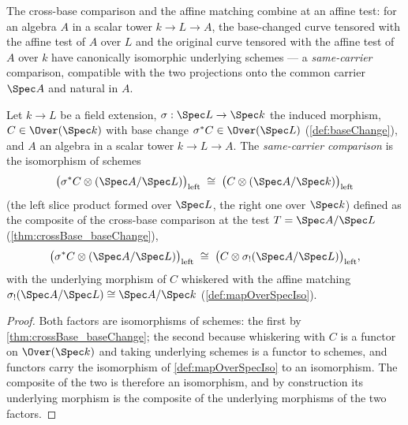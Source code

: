 The cross-base comparison and the affine matching combine at an affine test: for an
algebra \(A\) in a scalar tower \(k \to L \to A\), the base-changed curve tensored with
the affine test of \(A\) over \(L\) and the original curve tensored with the affine test
of \(A\) over \(k\) have canonically isomorphic underlying schemes --- a
\emph{same-carrier} comparison, compatible with the two projections onto the common
carrier \(\Spec A\) and natural in \(A\).

\begin{definition}
  \label{def:crossBaseAffineIso}
  \leanok
  Let \(k \to L\) be a field extension, \(\sigma : \Spec L \to \Spec k\) the induced
  morphism, \(C \in \Over(\Spec k)\) with base change \(\sigma^{*}C \in \Over(\Spec L)\)
  (\ref{def:baseChange}), and \(A\) an algebra in a scalar tower \(k \to L \to A\). The
  \emph{same-carrier comparison} is the isomorphism of schemes
  \[
    \bigl(\sigma^{*}C \otimes (\Spec A/\Spec L)\bigr)_{\mathrm{left}}
      \;\cong\; \bigl(C \otimes (\Spec A/\Spec k)\bigr)_{\mathrm{left}}
  \]
  (the left slice product formed over \(\Spec L\), the right one over \(\Spec k\))
  defined as the composite of the cross-base comparison at the test
  \(T = \Spec A/\Spec L\) (\ref{thm:crossBase_baseChange}),
  \[
    \bigl(\sigma^{*}C \otimes (\Spec A/\Spec L)\bigr)_{\mathrm{left}} \;\cong\;
    \bigl(C \otimes \sigma_{!}(\Spec A/\Spec L)\bigr)_{\mathrm{left}},
  \]
  with the underlying morphism of \(C\) whiskered with the affine matching
  \(\sigma_{!}(\Spec A/\Spec L) \cong \Spec A/\Spec k\) (\ref{def:mapOverSpecIso}).
\end{definition}
\begin{proof}
  \leanok
  Both factors are isomorphisms of schemes: the first by
  \ref{thm:crossBase_baseChange}; the second because whiskering with \(C\) is a functor
  on \(\Over(\Spec k)\) and taking underlying schemes is a functor to schemes, and
  functors carry the isomorphism of \ref{def:mapOverSpecIso} to an isomorphism. The
  composite of the two is therefore an isomorphism, and by construction its underlying
  morphism is the composite of the underlying morphisms of the two factors.
\end{proof}

